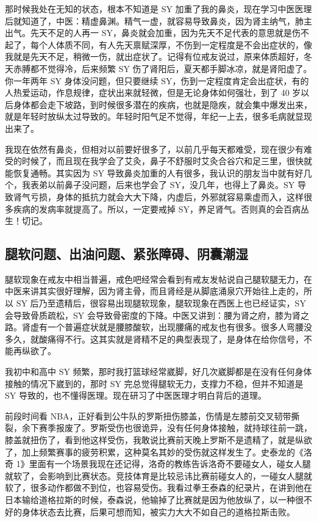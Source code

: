 \documentclass{ctexart}
\begin{document}
那时候我处在无知的状态，根本不知道是 SY 加重了我的鼻炎，现在学习中医医理后就知道了，中医：精虚鼻渊。精气一虚，就容易导致鼻炎，因为肾主纳气，肺主出气。先天不足的人再一 SY，鼻炎就会加重，因为先天不足代表的意思就是伤不起了，每个人体质不同，有人先天禀赋深厚，不伤到一定程度是不会出症状的，像我就是先天不足，稍微一伤，就出症状了。记得有位戒友说过，原来体质超好，冬天赤膊都不觉得冷，后来频繁 SY 伤了肾阳后，夏天都手脚冰凉，就是肾阳虚了。你一年两年 SY 身体没问题，但只要继续 SY，伤到一定程度肯定会出症状，有的人热爱运动，作息规律，症状出来就轻微，但是无论身体如何强壮，到了 40 岁以后身体都会走下坡路，到时候很多潜在的疾病，也就是隐疾，就会集中爆发出来，就是年轻时放纵太过导致的。年轻时阳气足不觉得，年纪一上去，很多毛病就显现出来了。

我现在依然有鼻炎，但相对以前要好很多了，以前几乎每天都难受，现在很少有难受的时候了，而且现在我学会了艾灸，鼻子不舒服时艾灸合谷穴和足三里，很快就能恢复通畅。其实因为 SY 导致鼻炎加重的人有很多，我认识的朋友当中就有好几个，我表弟以前鼻子没问题，后来也学会了 SY，没几年，也得上了鼻炎。SY 导致肾气亏损，身体的抵抗力就会大大下降，内虚后，外邪就容易乘虚而入，这样很多疾病的发病率就提高了。所以，一定要戒掉 SY，养足肾气。否则真的会百病丛生！切记。

\subsection{腿软问题、出油问题、紧张障碍、阴囊潮湿}

腿软现象在戒友中相当普遍，戒色吧经常会看到有戒友发帖说自己腿软腿无力，在中医来讲其实很好理解，因为肾主骨，而且肾经是从脚底涌泉穴开始往上走的，所以 SY 后乃至遗精后，很容易出现腿软现象，腿软现象在西医上也已经证实，SY 会导致骨质疏松，SY 会导致骨密度的下降。中医又讲到：腰为肾之府，膝为肾之路。肾虚有一个普遍症状就是腰膝酸软，出现腰痛的戒友也有很多。很多人弯腰没多久，就酸痛得不行。这其实就是肾精不足的典型表现了，是身体在给你信号，不能再纵欲了。

我初中和高中 SY 频繁，那时我打篮球经常崴脚，好几次崴脚都是在没有任何身体接触的情况下崴到的，那时 SY 完总觉得腿软无力，支撑力不稳，但并不知道是 SY 导致的，也不懂得医理。现在研习了中医医理才明白背后的道理。

前段时间看 NBA，正好看到公牛队的罗斯扭伤膝盖，伤情是左膝前交叉韧带撕裂，余下赛季报废了。罗斯受伤也很诡异，没有任何身体接触，就持球往前一跳，膝盖就扭伤了，看到他这样受伤，我敢说比赛前天晚上罗斯不是遗精了，就是纵欲了，加上频繁赛事的疲劳积累，这种莫名其妙的受伤就这样发生了。史泰龙的《洛奇 1》里面有一个场景我现在还记得，洛奇的教练告诉洛奇不要碰女人，碰女人腿就软了，会影响到比赛状态。竞技体育是比较忌讳比赛前碰女人的，一碰女人腿就软了，很多动作都做不到位，也容易受伤。我看过拳王泰森的纪录片，在讲到他在日本输给道格拉斯的时候，泰森说，他输掉了比赛就是因为他放纵了，以一种很不好的身体状态去比赛，后果可想而知，被实力大大不如自己的道格拉斯击败。
\end{document}

